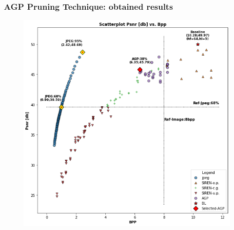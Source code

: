 



\begin{frame}
\frametitle{AGP Pruning Technique: obtained results}

\begin{figure}
\includegraphics[scale=0.40]{slides/experiments/pruning-tech/tmp_scatterplot_pruning.png}
\end{figure}

\end{frame}
